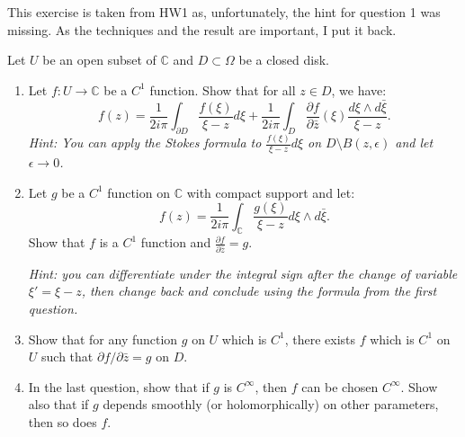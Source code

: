 \documentclass[12pt]{article}
\begin{document}
\begin{problem}{2}
This exercise is taken from HW1 as, unfortunately, the hint for question 1 was missing. As the techniques and the result are important, I put it back.

Let $U$ be an open subset of $\mathbb{C}$ and $D \subset \Omega$ be a closed disk.

\begin{enumerate}
    \item Let $f : U \to \mathbb{C}$ be a $C^1$ function. Show that for all $z \in D$, we have:
    \[
    f(z) = \frac{1}{2i\pi} \int_{\partial D} \frac{f(\xi)}{\xi - z} d\xi + \frac{1}{2i\pi} \int_D \frac{\partial f}{\partial \bar{z}}(\xi) \frac{d\xi \wedge d\bar{\xi}}{\xi - z}.
    \]
    \textit{Hint: You can apply the Stokes formula to $\frac{f(\xi)}{\xi-z} d\xi$ on $D \setminus B(z, \epsilon)$ and let $\epsilon \to 0$.}

    \item Let $g$ be a $C^1$ function on $\mathbb{C}$ with compact support and let:
    \[
    f(z) = \frac{1}{2i\pi} \int_{\mathbb{C}} \frac{g(\xi)}{\xi - z} d\xi \wedge d\bar{\xi}.
    \]
    Show that $f$ is a $C^1$ function and $\frac{\partial f}{\partial \bar{z}} = g$.

    \textit{Hint: you can differentiate under the integral sign after the change of variable $\xi' = \xi - z$, then change back and conclude using the formula from the first question.}

    \item Show that for any function $g$ on $U$ which is $C^1$, there exists $f$ which is $C^1$ on $U$ such that $\partial f/\partial \bar{z} = g$ on $D$.

    \item In the last question, show that if $g$ is $C^\infty$, then $f$ can be chosen $C^\infty$. Show also that if $g$ depends smoothly (or holomorphically) on other parameters, then so does $f$.
\end{enumerate}
\end{problem}
\begin{solution}

\end{solution}
\newpage
\end{document}
